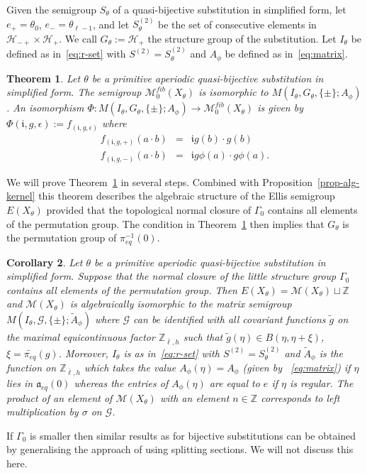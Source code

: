 \documentclass[10pt,a4paper]{amsart}
\newtheorem{theorem}{Theorem}[section]
\newtheorem{cor}[theorem]{Corollary}
\numberwithin{equation}{section}
\newcommand{\Z}{\mathbb Z}
\newcommand{\tcb}{\textcolor{blue}}
\newcommand{\ii}{{\mathfrak i}}
\newcommand{\Gg}{{\mathcal G}}
\newcommand{\Hh}{{\mathcal H}}
\newcommand{\aut}{{\mathfrak a}}
\newcommand{\aute}{\aut_{eq}}
\newcommand{\pe}{\pi_{eq}}
\newcommand{\tpe}{\widetilde{\pe}}
\newcommand{\M}{\mathcal M}
\newcommand{\Sfib}{\M^{fib}_0(X_\theta)}
\begin{document}


Given the semigroup $S_\theta$ of a quasi-bijective substitution in simplified form, let $e_+=\theta_0$, $e_-=\theta_{\ell-1}$, and let $S^{(2)}_\theta$ be the set of consecutive elements in $\Hh_{-+}\times \Hh_{+}$. 
We call $G_\theta:= \Hh_{+}$ the structure group of the substitution. Let $I_\theta$ be defined as in~\eqref{eq:r-set} with $S^{(2)}=S^{(2)}_\theta$ and $A_\phi$ be defined as in~\eqref{eq:matrix}.
\begin{theorem}\label{thm-RMG}
Let $\theta$ be a primitive aperiodic quasi-bijective substitution in simplified form. The semigroup $\Sfib$ is isomorphic to $M(I_\theta,G_\theta,\{\pm\};A_\phi)$. An isomorphism $\Phi:M(I_\theta,G_\theta,\{\pm\};A_\phi)\to \Sfib$ is given by $\Phi(\ii ,g,\epsilon):= f_{(\ii ,g,\epsilon)}$  where 
\begin{eqnarray*} f_{(\ii ,g,+)}( a\cdot b) &=&\ii g (b)\cdot g(b)\\
f_{(\ii ,g,-)}(a\cdot b) &=& \ii g\phi(a)\cdot  g\phi (a).
\end{eqnarray*} 
\end{theorem}
We will prove Theorem~\ref{thm-RMG} in several steps.
Combined with Proposition~\ref{prop-alg-kernel} this theorem describes the 
algebraic structure of the Ellis semigroup $E(X_\theta)$ provided that the topological normal closure of $\Gamma_0$ contains all elements of the permutation group. 
The condition in Theorem~\ref{thm-RMG} then implies that $G_\theta$ is the permutation group of $\pe^{-1}(0)$.
\begin{cor}\label{cor-main-qbij}
Let $\theta$ be a primitive aperiodic quasi-bijective substitution in simplified form. Suppose that the normal closure of the little structure group $\Gamma_0$ contains all elements of the permutation group. 
Then $E(X_\theta) = \M(X_\theta) \sqcup \Z$ and $\M(X_\theta)$ is algebraically isomorphic to the matrix semigroup 
$M(I_\theta,\Gg,\{\pm\};\tilde A_\phi)$
where $\Gg$ can be identified with all covariant functions $\tilde g$ on the maximal equicontinuous factor $\Z_{\bar{\ell},h}$ such that $ \tilde g(\eta) \in B(\eta,\eta+\xi)$, $\xi = \tpe(g)$. Moreover, $I_\theta$ is as in~\eqref{eq:r-set} with $S^{(2)}=S^{(2)}_\theta$ and $\tilde A_\phi$ is the function on $\Z_{\bar{\ell},h}$ which takes the value $A_\phi(\eta) = A_\phi$ (given by ~\eqref{eq:matrix})
if $\eta$ lies in $\aute(0)$ whereas the entries of $A_\phi(\eta)$ are equal to $e$ if  $\eta$ is regular. The product of an element of $\M(X_\theta)$ with an element $n\in \Z$ corresponds to left multiplication by $\sigma$ on $\Gg$.
\end{cor}
If $\Gamma_0$ is smaller then similar results as for bijective substitutions can be obtained by generalising the approach of \cite{ESBS} using splitting sections. We will not discuss this here. 
\end{document}

